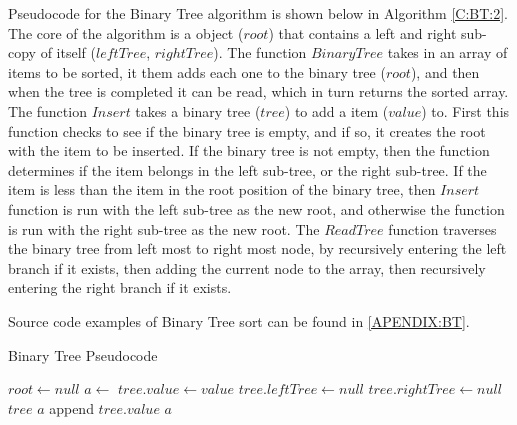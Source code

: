 \documentclass{subfile}
\begin{document}
\begin{multicols}{2}
  \par
  Pseudocode for the Binary Tree algorithm is shown below in Algorithm \ref{C:BT:2}. The core of the algorithm is a object ($root$) that contains a left and right sub-copy of itself ($leftTree$, $rightTree$). The function $BinaryTree$ takes in an array of items to be sorted, it them adds each one to the binary tree ($root$), and then when the tree is completed it can be read, which in turn returns the sorted array. The function $Insert$ takes a binary tree ($tree$) to add a item ($value$) to. First this function checks to see if the binary tree is empty, and if so, it creates the root with the item to be inserted. If the binary tree is not empty, then the function determines if the item belongs in the left sub-tree, or the right sub-tree. If the item is less than the item in the root position of the binary tree, then $Insert$ function is run with the left sub-tree as the new root, and otherwise the function is run with the right sub-tree as the new root. The $ReadTree$ function traverses the binary tree from left most to right most node, by recursively entering the left branch if it exists, then adding the current node to the array, then recursively entering the right branch if it exists.
  \par
  Source code examples of Binary Tree sort can be found in \ref{APENDIX:BT}.
\end{multicols}
\newpage
\begin{algorithm}
  \caption{Binary Tree Pseudocode}\label{C:BT:2}
  \begin{algorithmic}[1]
    \State $root\gets null$
      \State {}
    \EndFor
    \State $a \gets $
  \EndFunction
      \State $tree.value \gets value$
      \State $tree.leftTree \gets null$
      \State $tree.rightTree \gets null$
      \State {}
    \Else
      \State {}
    \EndIf
    \State \Return $tree$
  \EndFunction
      \State {}
      \State $a$ append $tree.value$
      \State {}
    \EndIf
    \State \Return $a$
  \EndFunction
\end{algorithmic}
\end{algorithm}
\newpage
\end{document}
